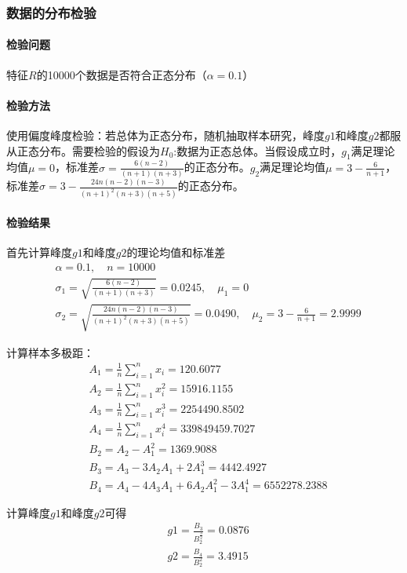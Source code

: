 \documentclass[UTF8]{ctexart}
\begin{document}
	\subsubsection{数据的分布检验}
	
	\paragraph{检验问题} 特征$R$的10000个数据是否符合正态分布（$\alpha=0.1$）
	
	\paragraph{检验方法} 使用偏度峰度检验：若总体为正态分布，随机抽取样本研究，峰度$g1$和峰度$g2$都服从正态分布。需要检验的假设为$H_0$:数据为正态总体。当假设成立时，$g_1$满足理论均值$\mu=0$，标准差$\sigma=\frac{6(n-2)}{(n+1)(n+3)}$的正态分布。$g_2$满足理论均值$\mu=3-\frac{6}{n+1}$，标准差$\sigma=3-\frac{24n(n-2)(n-3)}{(n+1)^2(n+3)(n+5)}$的正态分布。
	
	\paragraph{检验结果} 首先计算峰度$g1$和峰度$g2$的理论均值和标准差
	\begin{align*}
	& \alpha=0.1, \quad n=10000 \\
	& \sigma_1=\sqrt{\frac{6(n-2)}{(n+1)(n+3)}}=0.0245, \quad \mu_1=0 \\	
	& \sigma_2=\sqrt{\frac{24n(n-2)(n-3)}{(n+1)^2(n+3)(n+5)}}=0.0490, \quad \mu_2=3-\frac{6}{n+1}=2.9999
	\end{align*}
	
	计算样本多极距：
	\begin{align*}
	&  A_1 = \frac{1}{n} \sum_{i=1}^{n}x_i = 120.6077 \\
	&  A_2 = \frac{1}{n} \sum_{i=1}^{n}x_i^2 = 15916.1155 \\
	&  A_3 = \frac{1}{n} \sum_{i=1}^{n}x_i^3 = 2254490.8502 \\
	&  A_4 = \frac{1}{n} \sum_{i=1}^{n}x_i^4 = 339849459.7027 \\
	&  B_2 = A_2 - A_1^2 = 1369.9088 \\
	&  B_3 = A_3 - 3A_2A_1 + 2A_1^3 = 4442.4927 \\
	&  B_4 = A_4 - 4A_3A_1 + 6A_2A_1^2 - 3A_1^4 = 6552278.2388
	\end{align*}
	
	计算峰度$g1$和峰度$g2$可得
	\begin{align*}
	& g1= \frac{B_3}{B_2^{\frac{3}{2}}} = 0.0876 \\
	& g2= \frac{B_4}{B_2^2} = 3.4915
	\end{align*}
	
\end{document}
